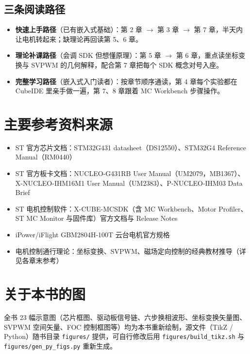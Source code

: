 \documentclass[
  UTF8,
  scheme=plain,
  fontsize=10pt,
  openany
]{ctexbook}
\begin{document}
\subsection*{三条阅读路径}\label{ux4e09ux6761ux9605ux8bfbux8defux5f84}

\begin{itemize}
\tightlist
\item
  \textbf{快速上手路径}（已有嵌入式基础）：第 2 章 \(\rightarrow\) 第 3
  章 \(\rightarrow\) 第 7 章，半天内让电机转起来；缺理论再回读第 5、6
  章。
\item
  \textbf{理论补课路径}（会调 SDK 但想懂原理）：第 5 章 \(\rightarrow\)
  第 6 章，重点读坐标变换与 SVPWM 的几何解释，配合第 7 章把每个 SDK
  概念对号入座。
\item
  \textbf{完整学习路径}（嵌入式入门读者）：按章节顺序通读，第 4
  章每个实验都在 CubeIDE 里亲手做一遍，第 7、8 章跟着 MC Workbench
  步骤操作。
\end{itemize}

\section*{主要参考资料来源}\label{ux4e3bux8981ux53c2ux8003ux8d44ux6599ux6765ux6e90}

\begin{itemize}
\tightlist
\item
  ST 官方芯片文档：STM32G431 datasheet（DS12550）、STM32G4 Reference
  Manual（RM0440）
\item
  ST 官方板卡文档：NUCLEO-G431RB User
  Manual（UM2079，MB1367）、X-NUCLEO-IHM16M1 User
  Manual（UM2383）、P-NUCLEO-IHM03 Data Brief
\item
  ST 电机控制软件：X-CUBE-MCSDK（含 MC Workbench、Motor Profiler、ST MC
  Monitor 与固件库）官方文档与 Release Notes
\item
  iPower/iFlight GBM2804H-100T 云台电机官方规格
\item
  电机控制通行理论：坐标变换、SVPWM、磁场定向控制的经典教材推导（详见各章末参考）
\end{itemize}

\section*{关于本书的图}\label{ux5173ux4e8eux672cux4e66ux7684ux56fe}

全书 23
幅示意图（芯片框图、驱动板信号链、六步换相波形、坐标变换矢量图、SVPWM
空间矢量、FOC 控制框图等）均为本书重新绘制，源文件（TikZ /
Python）随书目录 \texttt{figures/} 提供，可自行修改后用
\texttt{figures/build\_tikz.sh} 与 \texttt{figures/gen\_py\_figs.py}
重新生成。
\end{document}
